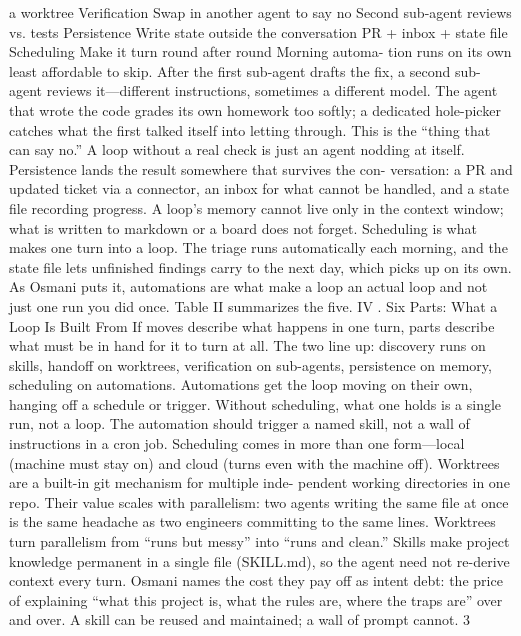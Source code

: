 \documentclass[conference]{IEEEtran}
\begin{document}
a worktree
Verification Swap in another
agent to say no
Second sub-agent
reviews vs. tests
Persistence Write state outside
the conversation
PR + inbox + state
file
Scheduling Make it turn round
after round
Morning automa-
tion runs on its own
least affordable to skip. After the first sub-agent drafts the fix, a
second sub-agent reviews it—different instructions, sometimes a
different model. The agent that wrote the code grades its own
homework too softly; a dedicated hole-picker catches what the
first talked itself into letting through. This is the “thing that can
say no.” A loop without a real check is just an agent nodding at
itself.
Persistence lands the result somewhere that survives the con-
versation: a PR and updated ticket via a connector, an inbox for
what cannot be handled, and a state file recording progress. A
loop’s memory cannot live only in the context window; what is
written to markdown or a board does not forget.
Scheduling is what makes one turn into a loop. The triage
runs automatically each morning, and the state file lets unfinished
findings carry to the next day, which picks up on its own. As
Osmani puts it, automations are what make a loop an actual loop
and not just one run you did once. Table II summarizes the five.
IV . Six Parts: What a Loop Is Built From
If moves describe what happens in one turn, parts describe
what must be in hand for it to turn at all. The two line up:
discovery runs on skills, handoff on worktrees, verification on
sub-agents, persistence on memory, scheduling on automations.
Automations get the loop moving on their own, hanging off
a schedule or trigger. Without scheduling, what one holds is a
single run, not a loop. The automation should trigger a named
skill, not a wall of instructions in a cron job. Scheduling comes
in more than one form—local (machine must stay on) and cloud
(turns even with the machine off).
Worktrees are a built-in git mechanism for multiple inde-
pendent working directories in one repo. Their value scales
with parallelism: two agents writing the same file at once is the
same headache as two engineers committing to the same lines.
Worktrees turn parallelism from “runs but messy” into “runs and
clean.”
Skills make project knowledge permanent in a single file
(SKILL.md), so the agent need not re-derive context every turn.
Osmani names the cost they pay off as intent debt: the price of
explaining “what this project is, what the rules are, where the
traps are” over and over. A skill can be reused and maintained; a
wall of prompt cannot.
3
\end{document}
